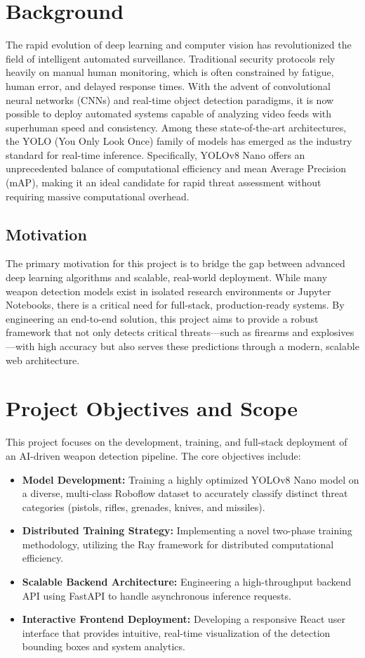 \documentclass[12pt, a4paper]{report}
\begin{document}
\section{Background}
The rapid evolution of deep learning and computer vision has revolutionized the field of intelligent automated surveillance. Traditional security protocols rely heavily on manual human monitoring, which is often constrained by fatigue, human error, and delayed response times. With the advent of convolutional neural networks (CNNs) and real-time object detection paradigms, it is now possible to deploy automated systems capable of analyzing video feeds with superhuman speed and consistency. Among these state-of-the-art architectures, the YOLO (You Only Look Once) family of models has emerged as the industry standard for real-time inference. Specifically, YOLOv8 Nano offers an unprecedented balance of computational efficiency and mean Average Precision (mAP), making it an ideal candidate for rapid threat assessment without requiring massive computational overhead.
\subsection{Motivation}
The primary motivation for this project is to bridge the gap between advanced deep learning algorithms and scalable, real-world deployment. While many weapon detection models exist in isolated research environments or Jupyter Notebooks, there is a critical need for full-stack, production-ready systems. By engineering an end-to-end solution, this project aims to provide a robust framework that not only detects critical threats—such as firearms and explosives—with high accuracy but also serves these predictions through a modern, scalable web architecture.

\section{Project Objectives and Scope}
This project focuses on the development, training, and full-stack deployment of an AI-driven weapon detection pipeline. The core objectives include:
\begin{itemize}
    \item \textbf{Model Development:} Training a highly optimized YOLOv8 Nano model on a diverse, multi-class Roboflow dataset to accurately classify distinct threat categories (pistols, rifles, grenades, knives, and missiles).
    \item \textbf{Distributed Training Strategy:} Implementing a novel two-phase training methodology, utilizing the Ray framework for distributed computational efficiency.
    \item \textbf{Scalable Backend Architecture:} Engineering a high-throughput backend API using FastAPI to handle asynchronous inference requests.
    \item \textbf{Interactive Frontend Deployment:} Developing a responsive React user interface that provides intuitive, real-time visualization of the detection bounding boxes and system analytics.
\end{itemize}
\end{document}
